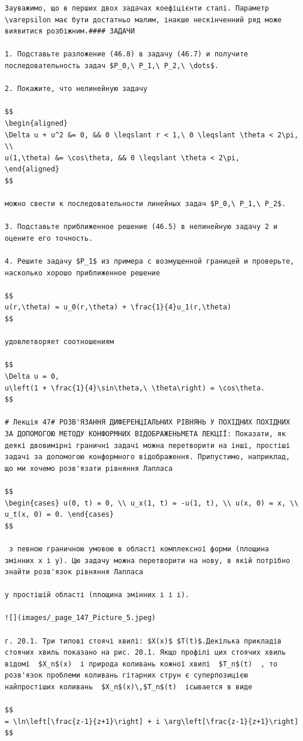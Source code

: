 \documentclass[
  ukrainian,
]{article}
\begin{document}
\begin{verbatim}
Зауважимо, що в перших двох задачах коефіцієнти сталі. Параметр \varepsilon має бути достатньо малим, інакше нескінченний ряд може виявитися розбіжним.#### ЗАДАЧИ

1. Подставьте разложение (46.8) в задачу (46.7) и получите последовательность задач $P_0,\ P_1,\ P_2,\ \dots$.

2. Покажите, что нелинейную задачу

$$
\begin{aligned}
\Delta u + u^2 &= 0, && 0 \leqslant r < 1,\ 0 \leqslant \theta < 2\pi, \\
u(1,\theta) &= \cos\theta, && 0 \leqslant \theta < 2\pi,
\end{aligned}
$$

можно свести к последовательности линейных задач $P_0,\ P_1,\ P_2$.

3. Подставьте приближенное решение (46.5) в нелинейную задачу 2 и оцените его точность.

4. Решите задачу $P_1$ из примера с возмущенной границей и проверьте, насколько хорошо приближенное решение

$$
u(r,\theta) = u_0(r,\theta) + \frac{1}{4}u_1(r,\theta)
$$

удовлетворяет соотношениям

$$
\Delta u = 0,
u\left(1 + \frac{1}{4}\sin\theta,\ \theta\right) = \cos\theta.
$$

# Лекція 47# РОЗВ'ЯЗАННЯ ДИФЕРЕНЦІАЛЬНИХ РІВНЯНЬ У ПОХІДНИХ ПОХІДНИХ ЗА ДОПОМОГОЮ МЕТОДУ КОНФОРМНИХ ВІДОБРАЖЕНЬМЕТА ЛЕКЦІЇ: Показати, як деякі двовимірні граничні задачі можна перетворити на інші, простіші задачі за допомогою конформного відображення. Припустимо, наприклад, що ми хочемо розв'язати рівняння Лапласа 

$$
\begin{cases} u(0, t) = 0, \\ u_x(1, t) = -u(1, t), \\ u(x, 0) = x, \\ u_t(x, 0) = 0. \end{cases}
$$

 з певною граничною умовою в області комплексної форми (площина змінних x і y). Цю задачу можна перетворити на нову, в якій потрібно знайти розв'язок рівняння Лапласа 

у простішій області (площина змінних і і і).

![](images/_page_147_Picture_5.jpeg)

г. 20.1. Три типові стоячі хвилі: $X(x)$ $T(t)$.Декілька прикладів стоячих хвиль показано на рис. 20.1. Якщо профілі цих стоячих хвиль відомі  $X_n$(x)  і природа коливань кожної хвилі  $T_n$(t)  , то розв'язок проблеми коливань гітарних струн є суперпозицією найпростіших коливань  $X_n$(x)\,$T_n$(t)  ісывается в виде

$$
= \ln\left[\frac{z-1}{z+1}\right] + i \arg\left[\frac{z-1}{z+1}\right]
$$
\end{verbatim}
\end{document}
